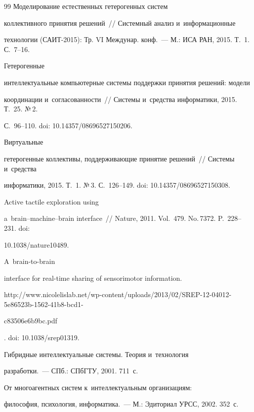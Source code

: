 {{\begin{thebibliography}{99}
 Моделирование естественных гетерогенных систем 


коллективного принятия решений~/\!\!/ Системный анализ и~информационные 


технологии (САИТ-2015): Тр. VI Междунар. конф.~--- М.: ИСА РАН, 2015. Т.~1. С.~7--16.




 Гетерогенные 


интеллектуальные компьютерные системы поддержки принятия решений: модели 


координации и~согласованности~/\!\!/ Системы и~средства информатики, 2015. Т.~25. №\,2. 


С.~96--110. doi: 10.14357/08696527150206.




 Виртуальные 


гетерогенные коллективы, поддерживающие принятие решений~/\!\!/ Системы и~средства 


информатики, 2015. Т.~1. №\,3. С.~126--149. doi: 10.14357/08696527150308.







 Active tactile exploration using 


a~brain--machine--brain interface~/\!\!/ Nature, 2011. Vol.~479. No.\,7372. P.~228--231. doi: 


10.1038/nature10489.




 A~brain-to-brain 


interface for real-time sharing of sensorimotor information. {\sf  


http://www.nicolelislab.net/wp-content/uploads/2013/02/SREP-12-04012-5e86523b-1562-41b8-bcd1-


c83506e6b9bc.pdf}. doi: 10.1038/srep01319.







 Гибридные интеллектуальные системы. Теория и~технология 


разработки.~--- СПб.: СПбГТУ, 2001. 711~с.







 От многоагентных систем к~интеллектуальным организациям: 


философия, психология, информатика.~--- М.: Эдиториал УРСС, 2002. 352~с.





     \end{thebibliography}


} }
